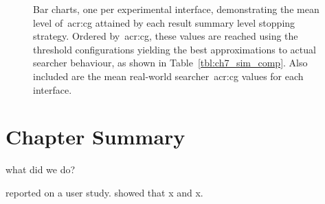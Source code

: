 \begin{figure}[p!]
    \centering
    \caption[Comparison~\gls{acr:cg} rankings (result summaries)]{Bar charts, one per experimental interface, demonstrating the mean level of~\gls{acr:cg} attained by each result summary level stopping strategy. Ordered by~\gls{acr:cg}, these values are reached using the threshold configurations yielding the best approximations to actual searcher behaviour, as shown in Table~\ref{tbl:ch7_sim_comp}. Also included are the mean real-world searcher~\gls{acr:cg} values for each interface.}
    \label{fig:ch7_sim_comparison_rankings}
\end{figure}

\section{Chapter Summary}
what did we do?

reported on a user study.
showed that x and x.

